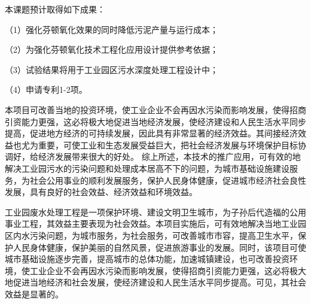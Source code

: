 {}\par
本课题预计取得如下成果：\par
（1）强化芬顿氧化效果的同时降低污泥产量与运行成本；\par
（2）为强化芬顿氧化技术工程化应用设计提供参考依据；\par
（3）试验结果将用于工业园区污水深度处理工程设计中；\par
（4）申请专利1-2项。\par
{}\par
本项目可改善当地的投资环境，使工业企业不会再因水污染而影响发展，使得招商引资能力更强，这必将极大地促进当地经济发展，使经济建设和人民生活水平同步提高，促进地方经济的可持续发展，因此具有非常显著的经济效益。其间接经济效益也尤为重要，可使工业和生态发展受益巨大，把社会经济发展与环境保护目标协调好，给经济发展带来很大的好处。
综上所述，本技术的推广应用，可有效的地解决工业园污水的污染问题和处理成本居高不下的问题，为城市基础设施建设服务，为社会公用事业的顺利发展服务，保护人民身体健康，促进城市经济社会良性发展，具有良好的社会效益、经济效益和环境效益。
{}\par
工业园废水处理工程是一项保护环境、建设文明卫生城市，为子孙后代造福的公用事业工程，其效益主要表现为社会效益。本项目实施后，可有效地解决当地工业园区内水污染问题，为城市服务，为社会服务，可改善城市市容，提高卫生水平，保护人民身体健康，保护美丽的自然风景，促进旅游事业的发展。同时，该项目可使城市基础设施逐步完善，提高城市的总体功能，加速城镇建设，也可改善投资环境，使工业企业不会再因水污染而影响发展，使得招商引资能力更强，这必将极大地促进当地经济和社会发展，使经济建设和人民生活水平同步提高。可见，其社会效益是显著的。
